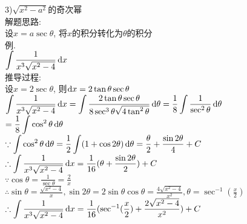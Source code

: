3)$\sqrt{x^2-a^2}$的奇次幂\\
解题思路:\\
设$x=a\sec\theta$, 将$x$的积分转化为$\theta$的积分\\
例.\\
\phantom{例}$\displaystyle\int\frac{1}{x^3\sqrt{x^2-4}}\mathop{}\!\mathrm{d} x$\\
推导过程:\\
设$x=2\sec\theta$, 则$\mathop{}\!\mathrm{d} x=2\tan\theta\sec\theta$\\
$\displaystyle\int\frac{1}{x^3\sqrt{x^2-4}}\mathop{}\!\mathrm{d} x=\int\frac{2\tan\theta\sec\theta}{8\sec^3\theta\sqrt{4\tan^2\theta}}\mathop{}\!\mathrm{d}\theta=\frac{1}{8}\int\frac{1}{\sec^2\theta}\mathop{}\!\mathrm{d}\theta$\\
$\displaystyle=\frac{1}{8}\int\cos^2\theta\mathop{}\!\mathrm{d}\theta$\\
$\displaystyle\because\int\cos^2\theta\mathop{}\!\mathrm{d}\theta=\frac{1}{2}\int(1+\cos2\theta)\mathop{}\!\mathrm{d}\theta=\frac{\theta}{2}+\frac{\sin2\theta}{4}+C$\\
$\displaystyle\therefore\int\frac{1}{x^3\sqrt{x^2-4}}\mathop{}\!\mathrm{d} x=\frac{1}{16}(\theta+\frac{\sin2\theta}{2})+C$\\
$\displaystyle\because\cos\theta=\frac{1}{\sec\theta}=\frac{2}{x}$\\
$\displaystyle\therefore\sin\theta=\frac{\sqrt{x^2-4}}{x},\sin2\theta=2\sin\theta\cos\theta=\frac{4\sqrt{x^2-4}}{x^2},\theta=\sec^{-1}(\frac{x}{2})$\\
$\displaystyle\therefore\int\frac{1}{x^3\sqrt{x^2-4}}\mathop{}\!\mathrm{d} x=\frac{1}{16}(\sec^{-1}(\frac{x}{2})+\frac{2\sqrt{x^2-4}}{x^2})+C$\\
